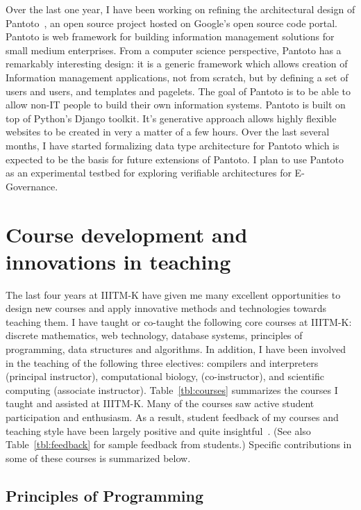 \documentclass[titlepage, %
11pt, 
]{article}
\begin{document}
Over the last one year, I have been working on refining the
architectural design of Pantoto~\cite{pantoto-google}, an
open source project hosted on Google's open source code
portal. Pantoto is web framework for building information
management solutions for small medium enterprises.  From a
computer science perspective, Pantoto has a remarkably
interesting design: it is a generic framework which allows
creation of Information management applications, not from
scratch, but by defining a set of users and users, and
templates and pagelets.  The goal of Pantoto is to be able
to allow non-IT people to build their own information
systems.  Pantoto is built on top of Python's Django
toolkit.  It's generative approach allows highly flexible
websites to be created in very a matter of a few hours.
Over the last several months, I have started formalizing
data type architecture for Pantoto which is expected to be
the basis for future extensions of Pantoto.  I plan to use
Pantoto as an experimental testbed for exploring verifiable
architectures for E-Governance. 


\section{Course development  and innovations in teaching}
\label{sec:teaching}

The last four years at IIITM-K have given me many excellent
opportunities to design new courses and apply innovative
methods and technologies towards teaching them.  I have
taught or co-taught the following core courses at IIITM-K:
discrete mathematics, web technology, database systems,
principles of programming, data structures and algorithms.
In addition, I have been involved in the teaching of the
following three electives: compilers and interpreters
(principal instructor), computational biology,
(co-instructor), and scientific computing (associate
instructor).  Table~\ref{tbl:courses} summarizes the courses
I taught and assisted at IIITM-K.  Many of the courses saw
active student participation and enthusiasm.  As a result,
student feedback of my courses and teaching style have been
largely positive and quite
insightful~\cite{iiitmk-course-reviews}. (See also
Table~\ref{tbl:feedback} for sample feedback from students.)
Specific contributions in some of these courses is
summarized below.

\subsection{Principles of Programming}
\label{subsec:pop}
\end{document}

